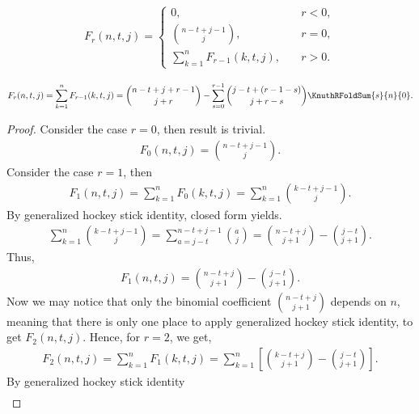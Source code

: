 \begin{definition}
  \begin{align*}
    F_{r} (n, t, j) =
    \begin{cases}
      0, \quad &r<0, \\
      \binom{n-t+j-1}{j}, \quad &r=0, \\
      \sum_{k=1}^{n} F_{r-1}(k, t, j), \quad &r>0.
    \end{cases}
  \end{align*}
\end{definition}

\begin{proposition}
  \begin{align*}
    F_{r} (n,t,j)
    = \sum_{k=1}^{n} F_{r-1} (k,t,j)
    = \binom{n-t+j+r-1}{j+r}
    -
    \sum_{s=0}^{r-1} \binom{j-t+(r-1-s)}{j+r-s}
    \KnuthRFoldSum{s}{n}{0}.
  \end{align*}
  \begin{proof}
    Consider the case $r=0$, then result is trivial.
    \begin{align*}
      F_0 (n,t,j) = \binom{n-t+j-1}{j}.
    \end{align*}
    Consider the case $r=1$, then
    \begin{align*}
      F_1 (n,t,j)
      = \sum_{k=1}^{n} F_0 (k,t,j)
      = \sum_{k=1}^{n} \binom{k-t+j-1}{j}.
    \end{align*}
    By generalized hockey stick identity, closed form
    yields.
    \begin{align*}
      \sum_{k=1}^{n} \binom{k-t+j-1}{j}
      =\sum_{a=j-t}^{n-t+j-1} \binom{a}{j}
      = \binom{n-t+j}{j+1} - \binom{j-t}{j+1}.
    \end{align*}
    Thus,
    \begin{align*}
      F_1 (n,t,j) = \binom{n-t+j}{j+1} - \binom{j-t}{j+1}.
    \end{align*}
    Now we may notice that only the binomial coefficient
    $\binom{n-t+j}{j+1}$ depends on $n$, meaning that
    there is only one place to apply generalized hockey stick
    identity, to get $F_2 (n, t, j)$.
    Hence, for $r=2$, we get,
    \begin{align*}
      F_2 (n,t,j)
      = \sum_{k=1}^{n} F_1 (k,t,j)
      = \sum_{k=1}^{n} \left[ \binom{k-t+j}{j+1} - \binom{j-t}{j+1} \right].
    \end{align*}
    By generalized hockey stick identity
    \begin{align*}

\end{align*}
\end{proof}
\end{proposition}
